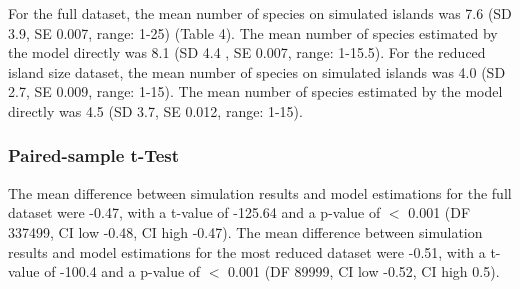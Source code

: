 \documentclass{article}
\begin{document}
For the full dataset, the mean number of species on simulated islands was 7.6 (SD 3.9, SE 0.007, range: 1-25) (Table 4).
The mean number of species estimated by the model directly was 8.1 (SD 4.4 , SE 0.007, range: 1-15.5). For the reduced island size dataset, the mean number of species on simulated islands was 4.0 (SD 2.7, SE 0.009, range: 1-15). The mean number of species estimated by the model directly was 4.5 (SD 3.7, SE 0.012, range: 1-15).

\subsubsection{Paired-sample t-Test}

\begin{table}[h!]
\caption{Paired-sample t-test for simulation data and model estimations}
\centering
{}
   \end{table}\bigskip
   
The mean difference between simulation results and model estimations for the full dataset were -0.47, with a t-value of -125.64 and a p-value of $<$ 0.001 (DF 337499, CI low -0.48, CI high -0.47). The mean difference between simulation results and model estimations for the most reduced dataset were -0.51, with a t-value of -100.4 and a p-value of $<$ 0.001 (DF 89999, CI low -0.52, CI high 0.5).
\end{document}
